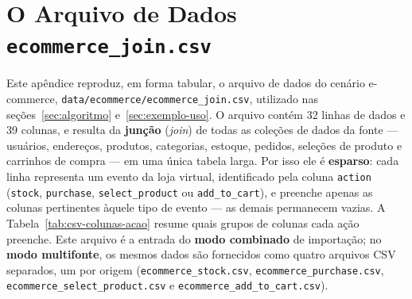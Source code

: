 \chapter{O Arquivo de Dados \texttt{ecommerce\_join.csv}}
\label{ap:csv}

Este apêndice reproduz, em forma tabular, o arquivo de dados do cenário e-commerce,
\texttt{data/ecommerce/ecommerce\_join.csv}, utilizado nas seções~\ref{sec:algoritmo}
e~\ref{sec:exemplo-uso}. O arquivo contém 32 linhas de dados e 39 colunas, e resulta da
\textbf{junção} (\textit{join}) de todas as coleções de dados da fonte --- usuários,
endereços, produtos, categorias, estoque, pedidos, seleções de produto e carrinhos de
compra --- em uma única tabela larga. Por isso ele é \textbf{esparso}: cada linha
representa um evento da loja virtual, identificado pela coluna \texttt{action}
(\texttt{stock}, \texttt{purchase}, \texttt{select\_product} ou \texttt{add\_to\_cart}),
e preenche apenas as colunas pertinentes àquele tipo de evento --- as demais permanecem
vazias. A Tabela~\ref{tab:csv-colunas-acao} resume quais grupos de colunas cada ação
preenche. Este arquivo é a entrada do \textbf{modo combinado} de importação; no
\textbf{modo multifonte}, os mesmos dados são fornecidos como quatro arquivos CSV separados,
um por origem (\texttt{ecommerce\_stock.csv}, \texttt{ecommerce\_purchase.csv},
\texttt{ecommerce\_select\_product.csv} e \texttt{ecommerce\_add\_to\_cart.csv}).

